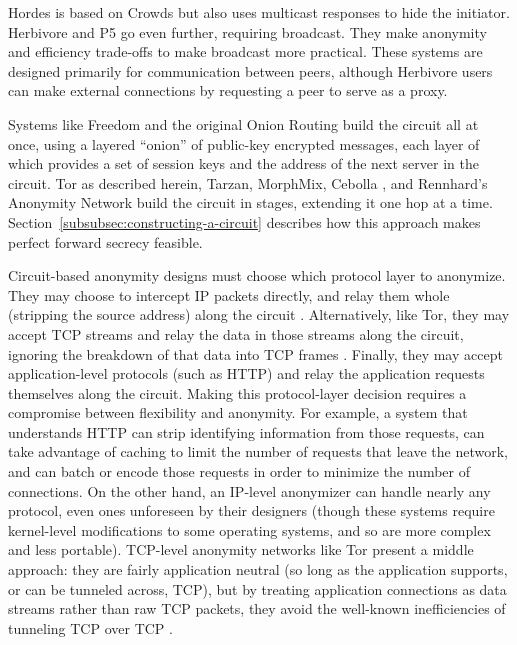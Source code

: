 \documentclass[times,10pt,twocolumn]{article}
\begin{document}
Hordes \cite{hordes-jcs} is based on Crowds but also uses multicast
responses to hide the initiator. Herbivore \cite{herbivore} and P5
\cite{p5} go even further, requiring broadcast. They make anonymity
and efficiency trade-offs to make broadcast more practical.
These systems are designed primarily for communication between peers,
although Herbivore users can make external connections by
requesting a peer to serve as a proxy.

Systems like Freedom and the original Onion Routing build the circuit
all at once, using a layered ``onion'' of public-key encrypted messages,
each layer of which provides a set of session keys and the address of the
next server in the circuit. Tor as described herein, Tarzan, MorphMix,
Cebolla \cite{cebolla}, and Rennhard's Anonymity Network \cite{anonnet}
build the circuit
in stages, extending it one hop at a time.
Section~\ref{subsubsec:constructing-a-circuit} describes how this
approach makes perfect forward secrecy feasible.

Circuit-based anonymity designs must choose which protocol layer
to anonymize. They may choose to intercept IP packets directly, and
relay them whole (stripping the source address) along the circuit
\cite{freedom2-arch,tarzan:ccs02}.  Alternatively, like
Tor, they may accept TCP streams and relay the data in those streams
along the circuit, ignoring the breakdown of that data into TCP frames
\cite{morphmix:fc04,anonnet}. Finally, they may accept application-level
protocols (such as HTTP) and relay the application requests themselves
along the circuit.  
Making this protocol-layer decision requires a compromise between flexibility
and anonymity.  For example, a system that understands HTTP can strip
identifying information from those requests, can take advantage of caching
to limit the number of requests that leave the network, and can batch
or encode those requests in order to minimize the number of connections.
On the other hand, an IP-level anonymizer can handle nearly any protocol,
even ones unforeseen by their designers (though these systems require
kernel-level modifications to some operating systems, and so are more
complex and less portable). TCP-level anonymity networks like Tor present
a middle approach: they are fairly application neutral (so long as the
application supports, or can be tunneled across, TCP), but by treating
application connections as data streams rather than raw TCP packets,
they avoid the well-known inefficiencies of tunneling TCP over TCP
\cite{tcp-over-tcp-is-bad}.
\end{document}

